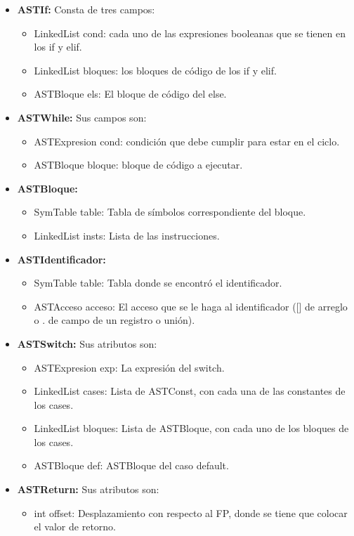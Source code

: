 \documentclass[11pt, spanish]{report}
\begin{document}
\begin{itemize}
\begin{itemize}
    El m\'etodo \emph{check} de esta clase, s\'olo es llamado cuando ya se sabe que la subrutina que se quiere invocar ha sido declarada anteriormente.
  \item \textbf{ASTIf:}
    Consta de tres campos:
    \begin{itemize}
    \item LinkedList cond: cada uno de las expresiones booleanas que se tienen en los if y elif.
    \item LinkedList bloques: los bloques de c\'odigo de los if y elif.
    \item ASTBloque els: El bloque de c\'odigo del else.
    \end{itemize}
  \item \textbf{ASTWhile:}
    Sus campos son:
    \begin{itemize}
    \item ASTExpresion cond: condici\'on que debe cumplir para estar en el ciclo.
    \item ASTBloque bloque: bloque de c\'odigo a ejecutar.
    \end{itemize}
  \item \textbf{ASTBloque:}
    \begin{itemize}
    \item SymTable table: Tabla de s\'imbolos correspondiente del bloque.
    \item LinkedList insts: Lista de las instrucciones.
    \end{itemize}
  \item \textbf{ASTIdentificador:}
    \begin{itemize}
    \item SymTable table: Tabla donde se encontr\'o el identificador.
    \item ASTAcceso acceso: El acceso que se le haga al identificador ([] de arreglo o . de campo de un registro o uni\'on).
    \end{itemize}
  \item \textbf{ASTSwitch:}
    Sus atributos son:
    \begin{itemize}
    \item ASTExpresion exp: La expresi\'on del switch.
    \item LinkedList cases: Lista de ASTConst, con cada una de las constantes de los cases.
    \item LinkedList bloques: Lista de ASTBloque, con cada uno de los bloques de los cases.
    \item ASTBloque def: ASTBloque del caso default.
    \end{itemize}
  \item \textbf{ASTReturn:}
    Sus atributos son:
    \begin{itemize}
    \item int offset: Desplazamiento con respecto al FP, donde se tiene que colocar el valor de retorno.
    \end{itemize}



\end{itemize}
\end{itemize}
\end{document}
